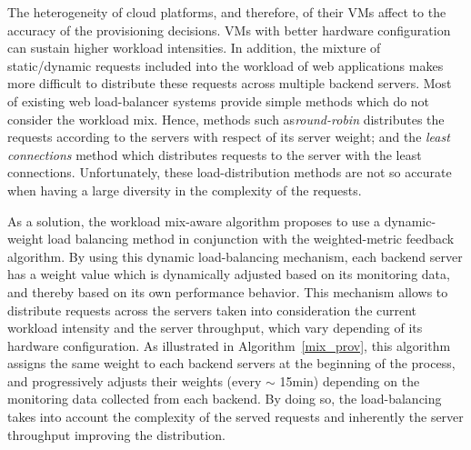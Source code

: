 The heterogeneity of cloud platforms, and therefore, of their VMs affect to the accuracy of the provisioning decisions. VMs with better hardware configuration can sustain higher workload intensities. In addition, the mixture of static/dynamic requests included into the workload of web applications makes more difficult to distribute these requests across multiple backend servers. Most of existing web load-balancer systems provide simple methods which do not consider the workload mix. Hence, methods such as\emph{round-robin} distributes the requests according to the servers with respect of its server weight; and the \emph{least connections} method which distributes requests to the server with the least connections. Unfortunately, these load-distribution methods are not so accurate when having a large diversity in the complexity of the requests. 

As a solution, the workload mix-aware algorithm proposes to use a dynamic-weight load balancing method in conjunction with the weighted-metric feedback algorithm. By using this dynamic load-balancing mechanism, each backend server has a weight value which is dynamically adjusted based on its monitoring data, and thereby based on its own performance behavior. This mechanism allows to distribute requests across the servers taken into consideration the current workload intensity and the server throughput, which vary depending of its hardware configuration. As illustrated in Algorithm~\ref{mix_prov}, this algorithm assigns the same weight to each backend servers at the beginning of the process, and progressively adjusts their weights  (every $\sim$ 15min) depending on the monitoring data collected from each backend. By doing so, the load-balancing takes into account the complexity of the served requests and inherently the server throughput improving the distribution.


